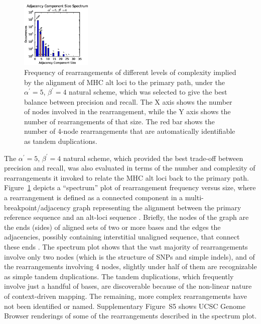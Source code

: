 \begin{figure}[t]
	\centering
    \includegraphics[width=0.3\textwidth]{figures/02_contextschemes/mhcRearrangements.eps}
  \caption{Frequency of rearrangements of different levels of complexity implied by the alignment of MHC alt loci to the primary path, under the $\alpha^\prime = 5$, $\beta^\prime = 4$ natural scheme, which was selected to give the best balance between precision and recall. The X axis shows the number of nodes involved in the rearrangement, while the Y axis shows the number of rearrangements of that size. The red bar shows the number of 4-node rearrangements that are automatically identifiable as tandem duplications.}
  \label{fig:rearrangements}
\end{figure}


The $\alpha^\prime = 5$, $\beta^\prime = 4$ natural scheme, which provided the best trade-off between precision and recall, was also evaluated in terms of the number and complexity of rearrangements it invoked to relate the MHC alt loci back to the primary path. Figure~\ref{fig:rearrangements} depicts a ``spectrum'' plot of rearrangement frequency versus size, where a rearrangement is defined as a connected component in a multi-breakpoint/adjacency %
graph representing the alignment between the primary reference sequence and an alt-loci sequence \citep{medvedev2007computability,paten2011cactus}. Briefly, the nodes of the graph are the ends (sides) of aligned sets of two or more bases and the edges the adjacencies, possibly containing interstitial unaligned sequence, that connect these ends \citep{medvedev2007computability,paten2011cactus}. The spectrum plot shows that the vast majority of rearrangements involve only two nodes (which is the structure of SNPs and simple indels), and of the rearrangements involving 4 nodes, slightly under half of them are recognizable as simple tandem duplications. The tandem duplications, which frequently involve just a handful of bases, are discoverable because of the non-linear nature of context-driven mapping. The remaining, more complex rearrangements have not been identified or named. Supplementary Figure~S5 shows UCSC Genome Browser renderings of some of the rearrangements described in the spectrum plot. 

